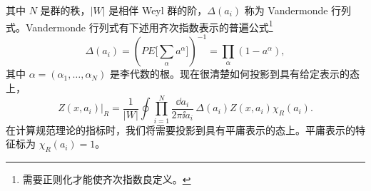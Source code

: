 其中 $N$ 是群的秩，$|W|$ 是相伴 Weyl 群的阶，$\Delta(a_i)$ 称为 Vandermonde 行列式。Vandermonde 行列式有下述用齐次指数表示的普遍公式\footnote{需要正则化才能使齐次指数良定义。}
\[
\Delta(a_i) = \left(PE\Big[\sum_{\alpha} a^\alpha\Big]\right)^{-1} = \prod_{\alpha}(1-a^\alpha) ,
\tag{1.29}
\]
其中 $\alpha = (\alpha_1,\ldots,\alpha_N)$ 是李代数的根。现在很清楚如何投影到具有给定表示的态上，
\[
Z(x,a_i)\big|_{R} = \frac{1}{|W|}\oint\prod_{i=1}^{N}\frac{\dd a_i}{2\pi\ii a_i}\,\Delta(a_i)Z(x,a_i)\chi_R(a_i) .
\tag{1.30}
\]
在计算规范理论的指标时，我们将需要投影到具有平庸表示的态上。平庸表示的特征标为 $\chi_R(a_i) = 1$。

